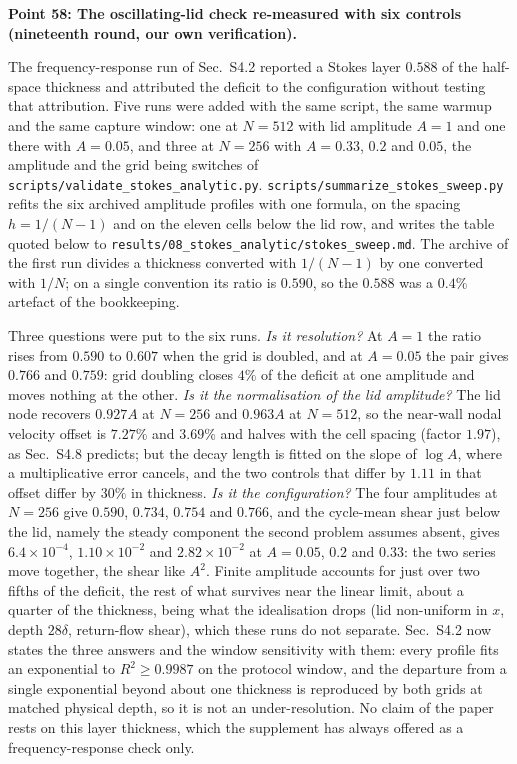 \documentclass[11pt,a4paper]{article}
\newcommand{\brk}{\hspace{0pt}}
\begin{document}
\vspace{1em}

\noindent\textbf{Point 58: The oscillating-lid check re-measured with six controls
(nineteenth round, our own verification).}

The frequency-response run of Sec.~S4.2 reported a Stokes layer \(0.588\) of the
half-space thickness and attributed the deficit to the configuration without
testing that attribution. Five runs were added with the same script, the same
warmup and the same capture window: one at \(N=512\) with lid amplitude \(A=1\)
and one there with \(A=0.05\), and three at \(N=256\) with \(A=0.33\), \(0.2\)
and \(0.05\), the amplitude and the grid being switches of
\texttt{scripts/validate\_stokes\_analytic\brk.py}.
\texttt{scripts/summarize\_stokes\_sweep\brk.py} refits the six archived amplitude
profiles with one formula, on the spacing \(h=1/(N-1)\) and on the eleven cells
below the lid row, and writes the table quoted below to
\texttt{results/08\_stokes\_analytic/stokes\_sweep.md}. The archive of the first
run divides a thickness converted with \(1/(N-1)\) by one converted with \(1/N\);
on a single convention its ratio is \(0.590\), so the \(0.588\) was a
\(0.4\%\) artefact of the bookkeeping.

Three questions were put to the six runs. \emph{Is it resolution?} At \(A=1\) the
ratio rises from \(0.590\) to \(0.607\) when the grid is doubled, and at \(A=0.05\)
the pair gives \(0.766\) and \(0.759\): grid doubling closes \(4\%\) of the
deficit at one amplitude and moves nothing at the other. \emph{Is it the
normalisation of the lid amplitude?} The lid node recovers \(0.927A\) at
\(N=256\) and \(0.963A\) at \(N=512\), so the near-wall nodal velocity offset is
\(7.27\%\) and \(3.69\%\) and halves with the cell spacing (factor \(1.97\)), as
Sec.~S4.8 predicts; but the decay length is fitted on the slope of \(\log A\),
where a multiplicative error cancels, and the two controls that differ by
\(1.11\) in that offset differ by \(30\%\) in thickness. \emph{Is it the
configuration?} The four amplitudes at \(N=256\) give \(0.590\), \(0.734\),
\(0.754\) and \(0.766\), and the cycle-mean shear just below the lid, namely the
steady component the second problem assumes absent, gives
\(6.4\times10^{-4}\), \(1.10\times10^{-2}\) and \(2.82\times10^{-2}\) at \(A=0.05\),
\(0.2\) and \(0.33\): the two series move together, the shear like \(A^2\). Finite
amplitude accounts for just over two fifths of the deficit, the rest of what
survives near the linear limit, about a quarter of the thickness, being what the
idealisation drops (lid non-uniform in \(x\), depth \(28\delta\), return-flow
shear), which these runs do not separate. Sec.~S4.2 now states the three answers
and the window sensitivity with them: every profile fits an exponential to
\(R^2\ge0.9987\) on the protocol window, and the departure from a single
exponential beyond about one thickness is reproduced by both grids at matched
physical depth, so it is not an under-resolution. No claim of the paper rests on
this layer thickness, which the supplement has always offered as a
frequency-response check only.
\end{document}
